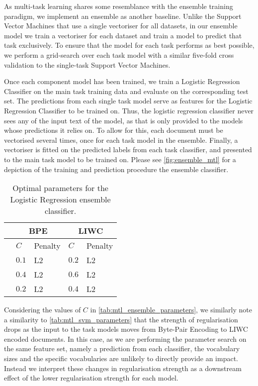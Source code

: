 As multi-task learning shares some resemblance with the ensemble training paradigm, we implement an ensemble as another baseline. Unlike the Support Vector Machines that use a single vectoriser for all datasets, in our ensemble model we train a vectoriser for each dataset and train a model to predict that task exclusively. To ensure that the model for each task performs as best possible, we perform a grid-search over each task model with a similar five-fold cross validation to the single-task Support Vector Machines.
\begin{figure}
  \centering
  \label{fig:ensemble_mtl}
\end{figure}

Once each component model has been trained, we train a Logistic Regression Classifier on the main task training data and evaluate on the corresponding test set. The predictions from each single task model serve as features for the Logistic Regression Classifier to be trained on. Thus, the logistic regression classifier never sees any of the input text of the model, as that is only provided to the models whose predictions it relies on. To allow for this, each document must be vectorised several times, once for each task model in the ensemble. Finally, a vectoriser is fitted on the predicted labels from each task classifier, and presented to the main task model to be trained on. Please see \autoref{fig:ensemble_mtl} for a depiction of the training and prediction procedure the ensemble classifier.

\begin{table}[]
\centering
\begin{tabular}{l|ll|ll}
                     & \multicolumn{2}{c}{BPE} & \multicolumn{2}{c}{LIWC} \\ \hline
                     & $C$     & Penalty       & $C$      & Penalty       \\ \hline
\cite{Waseem:2016}   & $0.1$   & L2            & $0.2$    & L2             \\
\cite{Davidson:2017} & $0.4$   & L2            & $0.6$    & L2             \\
\cite{Wulczyn:2016}  & $0.2$   & L2            & $0.4$    & L2
\end{tabular}
\caption{Optimal parameters for the Logistic Regression ensemble classifier.}
\label{tab:mtl_ensemble_parameters}
\end{table}

Considering the values of $C$ in \autoref{tab:mtl_ensemble_parameters}, we similarly note a similarity to \autoref{tab:mtl_svm_parameters} that the strength of regularisation drops as the input to the task models moves from Byte-Pair Encoding to LIWC encoded documents. In this case, as we are performing the parameter search on the same feature set, namely a prediction from each classifier, the vocabulary sizes and the specific vocabularies are unlikely to directly provide an impact. Instead we interpret these changes in regularisation strength as a downstream effect of the lower regularisation strength for each model.

